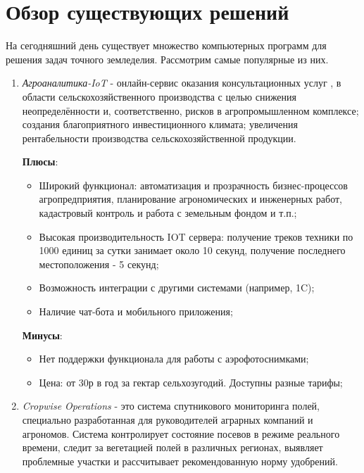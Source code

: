     \section{Обзор существующих решений} \label{existing}

    На сегодняшний день существует множество компьютерных программ для решения задач точного земледелия. Рассмотрим самые популярные из них. 

    \begin{enumerate}
       
    
         \item \textit{Агроаналитика-IoT} \cite{smartagro} - онлайн-сервис оказания консультационных услуг , в области сельскохозяйственного производства с целью снижения неопределённости и, соответственно, рисков в агропромышленном комплексе; создания благоприятного инвестиционного климата; увеличения рентабельности производства сельскохозяйственной продукции. 
         
        \textbf{Плюсы}:  
        \begin{itemize}
                \item Широкий функционал: автоматизация и прозрачность бизнес-процессов агропредприятия, планирование агрономических и инженерных работ, кадастровый контроль и работа с земельным фондом и т.п.;
                \item Высокая производительность IOT сервера: получение треков техники по 1000 единиц за сутки занимает около 10 секунд, получение последнего местоположения - 5 секунд;
                \item Возможность интеграции с другими системами (например, 1C);
                \item Наличие чат-бота и мобильного приложения; 
        \end{itemize}
        \textbf{Минусы}:
        \begin{itemize}
                \item Нет поддержки функционала для работы с аэрофотоснимками;
                \item Цена: от 30р в год за гектар сельхозугодий. Доступны разные тарифы;
        \end{itemize}


        \item \textit{Cropwise Operations}\cite{cropwise} - это система спутникового мониторинга полей, специально разработанная для руководителей аграрных компаний и агрономов. Система контролирует состояние посевов в режиме реального времени, следит за вегетацией полей в различных регионах, выявляет проблемные участки и рассчитывает рекомендованную норму удобрений.
         

\end{enumerate}

